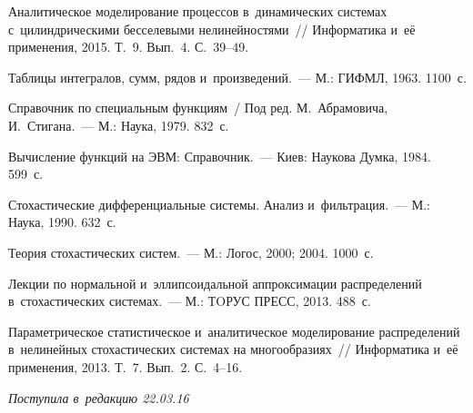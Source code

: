 \begin{multicols}{2}
{    }

{\small\frenchspacing
 {%
 \begin{thebibliography}{9}


Аналитическое моделирование процессов в~динамических системах с~цилиндрическими 
бесселевыми нелинейностями~// Информатика и~её применения, 2015. 
Т.~9. Вып.~4. С.~39--49.

Таблицы интегралов, сумм, рядов и~произведений.~--- М.: ГИФМЛ, 1963. 1100~с.

Справочник по специальным функциям~/ Под ред. М.~Абрамовича, И.~Стигана.~--- 
М.: Наука, 1979. 832~с.

Вычисление функций на ЭВМ: Справочник.~--- Киев: Наукова Думка, 1984. 599~с.

Стохастические дифференциальные системы. Анализ и~фильтрация.~--- М.:
Наука,  1990.  632~с. 

Теория стохастических систем.~--- М.: Логос, 2000; 2004. 1000~с.

Лекции по нормальной и~эллипсоидальной аппроксимации распределений 
в~стохастических системах.~--- М.: ТOРУС ПРЕСС, 2013. 488~с.

Параметрическое статистическое и~аналитическое моделирование распределений 
в~нелинейных стохастических системах на многообразиях~// Информатика 
и~её применения, 2013. Т.~7. Вып.~2. С.~4--16.
\end{thebibliography}

 }
 }

\end{multicols}

\vspace*{-3pt}

\hfill{\small\textit{Поступила в~редакцию 22.03.16}}

\vspace*{7pt}


